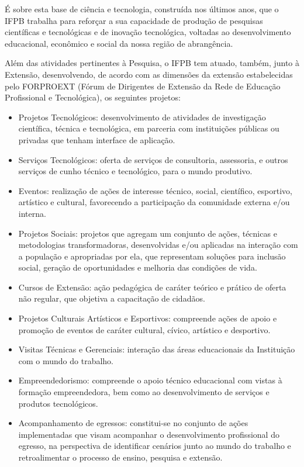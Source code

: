 	É sobre esta base de ciência e tecnologia, construída nos últimos anos, que o IFPB trabalha para reforçar a sua capacidade de produção de pesquisas científicas e tecnológicas e de inovação tecnológica, voltadas ao desenvolvimento educacional, econômico e social da nossa região de abrangência.

	Além das atividades pertinentes à Pesquisa, o IFPB tem atuado, também, junto à Extensão, desenvolvendo, de acordo com as dimensões da extensão estabelecidas pelo FORPROEXT (Fórum de Dirigentes de Extensão da Rede de Educação Profissional e Tecnológica), os seguintes projetos:
	
	\begin{itemize}
		\item Projetos Tecnológicos: desenvolvimento de atividades de investigação científica, técnica e tecnológica, em parceria com instituições públicas ou privadas que tenham interface de aplicação.
		\item Serviços Tecnológicos: oferta de serviços de consultoria, assessoria, e outros serviços de cunho técnico e tecnológico, para o mundo produtivo.
		\item Eventos: realização de ações de interesse técnico, social, científico, esportivo, artístico e cultural, favorecendo a participação da comunidade externa e/ou interna.
		\item Projetos Sociais: projetos que agregam um conjunto de ações, técnicas e metodologias transformadoras, desenvolvidas e/ou aplicadas na interação com a população e apropriadas por ela, que representam soluções para inclusão social, geração de oportunidades e melhoria das condições de vida.
		\item Cursos de Extensão: ação pedagógica de caráter teórico e prático de oferta não regular, que objetiva a capacitação de cidadãos.
		\item Projetos Culturais Artísticos e Esportivos: compreende ações de apoio e promoção de eventos de caráter cultural, cívico, artístico e desportivo.
		\item Visitas Técnicas e Gerenciais: interação das áreas educacionais da Instituição com o mundo do trabalho.
		\item Empreendedorismo: compreende o apoio técnico educacional com vistas à formação empreendedora, bem como ao desenvolvimento de serviços e produtos tecnológicos.
		\item Acompanhamento de egressos: constitui-se no conjunto de ações implementadas que visam acompanhar o desenvolvimento profissional do egresso, na perspectiva de identificar cenários junto ao mundo do trabalho e retroalimentar o processo de ensino, pesquisa e extensão.
	\end{itemize}

